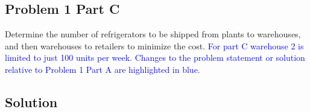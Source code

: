 \documentclass[../report/main.tex]{subfiles}
\begin{document}
\subsection*{Problem 1 Part C}
Determine the number of refrigerators to be shipped from plants to warehouses, and then warehouses to retailers to minimize the cost.  \textcolor{blue}{For part C warehouse 2 is limited to just 100 units per week.  Changes to the problem statement or solution relative to Problem 1 Part A are highlighted in blue.}

\subsection*{Solution}
\end{document}
